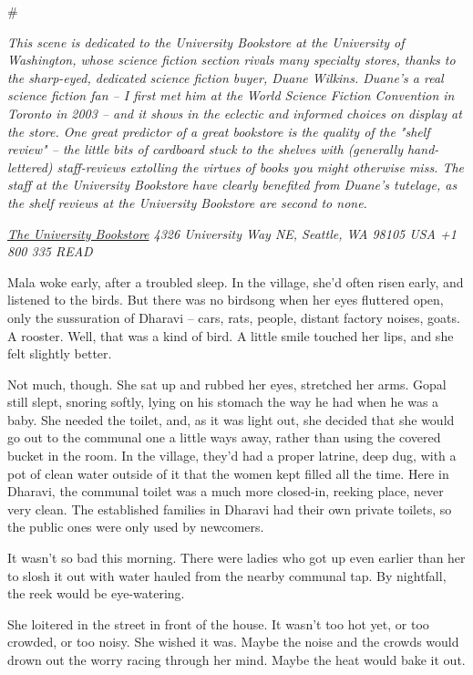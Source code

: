\#

\emph{This scene is dedicated to the University Bookstore at the University of Washington, whose science fiction section rivals many specialty stores, thanks to the sharp-eyed, dedicated science fiction buyer, Duane Wilkins. Duane's a real science fiction fan -- I first met him at the World Science Fiction Convention in Toronto in 2003 -- and it shows in the eclectic and informed choices on display at the store. One great predictor of a great bookstore is the quality of the "shelf review" -- the little bits of cardboard stuck to the shelves with (generally hand-lettered) staff-reviews extolling the virtues of books you might otherwise miss. The staff at the University Bookstore have clearly benefited from Duane's tutelage, as the shelf reviews at the University Bookstore are second to none.}

\emph{\href{http://www4.bookstore.washington.edu/_trade/ShowTitleUBS.taf?ActionArg=Title&ISBN=9780765322166}{The University Bookstore} 4326 University Way NE, Seattle, WA 98105 USA +1 800 335 READ}

Mala woke early, after a troubled sleep. In the village, she'd
often risen early, and listened to the birds. But there was no
birdsong when her eyes fluttered open, only the sussuration of
Dharavi -- cars, rats, people, distant factory noises, goats. A
rooster. Well, that was a kind of bird. A little smile touched her
lips, and she felt slightly better.

Not much, though. She sat up and rubbed her eyes, stretched her
arms. Gopal still slept, snoring softly, lying on his stomach the
way he had when he was a baby. She needed the toilet, and, as it
was light out, she decided that she would go out to the communal
one a little ways away, rather than using the covered bucket in the
room. In the village, they'd had a proper latrine, deep dug, with a
pot of clean water outside of it that the women kept filled all the
time. Here in Dharavi, the communal toilet was a much more
closed-in, reeking place, never very clean. The established
families in Dharavi had their own private toilets, so the public
ones were only used by newcomers.

It wasn't so bad this morning. There were ladies who got up even
earlier than her to slosh it out with water hauled from the nearby
communal tap. By nightfall, the reek would be eye-watering.

She loitered in the street in front of the house. It wasn't too hot
yet, or too crowded, or too noisy. She wished it was. Maybe the
noise and the crowds would drown out the worry racing through her
mind. Maybe the heat would bake it out.

